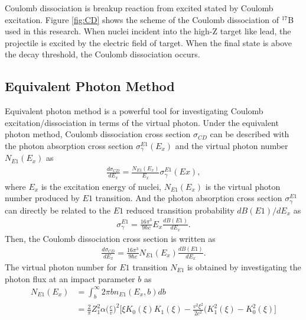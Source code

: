 Coulomb dissociation is breakup reaction from excited stated by Coulomb excitation. Figure \ref{fig:CD} shows the scheme of the Coulomb dissociation of ${}^{17}$B used in this research. When nuclei incident into the high-Z target like lead, the projectile is excited by the electric field of target. When the final state is above the decay threshold, the Coulomb dissociation occurs.

\subsection{Equivalent Photon Method}
Equivalent photon method\cite{Jackson}\cite{Bertulani}\cite{Aumann} is a powerful tool for investigating Coulomb excitation/dissociation in terms of the virtual photon. Under the equivalent photon method, Coulomb dissociation cross section $\sigma_{CD}$ can be described with the photon absorption cross section $\sigma_{\gamma}^{E1}(E_x)$ and the virtual photon number $N_{E1}(E_x)$ as
\begin{align}
    \frac{d\sigma_{CD}}{dE_x} = \frac{N_{E1}(E_x)}{E_x} \sigma_{\gamma}^{E1}(Ex),
\end{align}
where $E_x$ is the excitation energy of nuclei, $N_{E1}(E_x)$ is the virtual photon number produced by $E1$ transition. And the photon absorption cross section $\sigma_{\gamma}^{E1}$ can directly be related to the $E1$ reduced transition probability $dB(E1)/dE_x$ as
\begin{align}
    \sigma_{\gamma}^{E1} = \frac{16 \pi^3}{9 \hbar c} E_x \frac{dB(E1)}{dE_x}. \label{eq:photon_absorption}
\end{align}
Then, the Coulomb dissociation cross section is written as
\begin{align}
    \frac{d\sigma_{CD}}{dE_x} = \frac{16 \pi^3}{9 \hbar c} N_{E1}(E_x) \frac{dB(E1)}{dE_x}.
\end{align}
The virtual photon number for $E1$ transition $N_{E1}$ is obtained by investigating the photon flux at an impact parameter $b$ as
\begin{align}
    N_{E1}(E_x) &= \int_{b}^{\infty} 2\pi b n_{E1}(E_x, b) db  \\
                &=\frac{2}{\pi}Z^{2}_{1}\alpha\Big(\frac{c}{v}\Big)^{2}\Big[\xi K_{0}(\xi)K_{1}(\xi)-\frac{v^{2}\xi^{2}}{2c^{2}}(K^{2}_{1}(\xi)-K^{2}_{0}(\xi)\Big]
\end{align}

